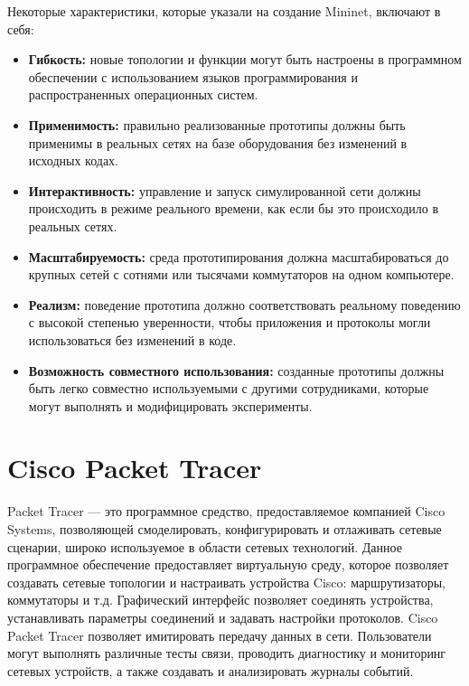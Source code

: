 Некоторые характеристики, которые указали на создание Mininet, включают в себя:

\begin{itemize}
  \item \textbf{Гибкость:} новые топологии и функции могут быть настроены в программном обеспечении с использованием языков программирования и распространенных операционных систем.
  
  \item \textbf{Применимость:} правильно реализованные прототипы должны быть применимы в реальных сетях на базе оборудования без изменений в исходных кодах.
  
  \item \textbf{Интерактивность:} управление и запуск симулированной сети должны происходить в режиме реального времени, как если бы это происходило в реальных сетях.
  
  \item \textbf{Масштабируемость:} среда прототипирования должна масштабироваться до крупных сетей с сотнями или тысячами коммутаторов на одном компьютере.
  
  \item \textbf{Реализм:} поведение прототипа должно соответствовать реальному поведению с высокой степенью уверенности, чтобы приложения и протоколы могли использоваться без изменений в коде.
  
  \item \textbf{Возможность совместного использования:} созданные прототипы должны быть легко совместно используемыми с другими сотрудниками, которые могут выполнять и модифицировать эксперименты.
\end{itemize}


\section{Cisco Packet Tracer}
\label{chap1:sec3}

Packet Tracer — это программное средство, предоставляемое компанией
Cisco Systems, позволяющей смоделировать, конфигурировать и отлаживать
сетевые сценарии, широко используемое в области сетевых
технологий. Данное программное обеспечение предоставляет виртуальную
среду, которое позволяет создавать сетевые топологии и настраивать
устройства Cisco: маршрутизаторы, коммутаторы и т.д. Графический
интерфейс позволяет соединять устройства, устанавливать параметры
соединений и задавать настройки протоколов. Cisco Packet Tracer
позволяет имитировать передачу данных в сети. Пользователи могут
выполнять различные тесты связи, проводить диагностику и мониторинг
сетевых устройств, а также создавать и анализировать журналы событий.

